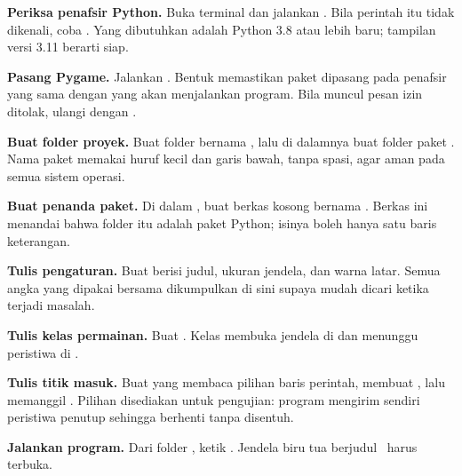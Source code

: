 \begin{langkah}
  \item \textbf{Periksa penafsir Python.} Buka terminal dan jalankan
        . Bila perintah itu tidak dikenali, coba
        . Yang dibutuhkan adalah Python 3.8 atau lebih
        baru; tampilan versi 3.11 berarti siap.

  \item \textbf{Pasang Pygame.} Jalankan
        . Bentuk 
        memastikan paket dipasang pada penafsir yang sama dengan yang akan
        menjalankan program. Bila muncul pesan izin ditolak, ulangi dengan
        .

  \item \textbf{Buat folder proyek.} Buat folder bernama
        , lalu di dalamnya buat folder paket
        . Nama paket memakai huruf kecil dan garis
        bawah, tanpa spasi, agar aman pada semua sistem operasi.

  \item \textbf{Buat penanda paket.} Di dalam , buat
        berkas kosong bernama . Berkas ini menandai bahwa
        folder itu adalah paket Python; isinya boleh hanya satu baris
        keterangan.

  \item \textbf{Tulis pengaturan.} Buat 
        berisi judul, ukuran jendela, dan warna latar. Semua angka yang
        dipakai bersama dikumpulkan di sini supaya mudah dicari ketika
        terjadi masalah.

  \item \textbf{Tulis kelas permainan.} Buat
        . Kelas  membuka jendela di
         dan menunggu peristiwa di .

  \item \textbf{Tulis titik masuk.} Buat  yang membaca pilihan
        baris perintah, membuat , lalu memanggil .
        Pilihan  disediakan untuk pengujian: program
        mengirim sendiri peristiwa penutup sehingga berhenti tanpa disentuh.

  \item \textbf{Jalankan program.} Dari folder , ketik
        . Jendela biru tua berjudul \NamaPermainan\
        harus terbuka.
\end{langkah}


